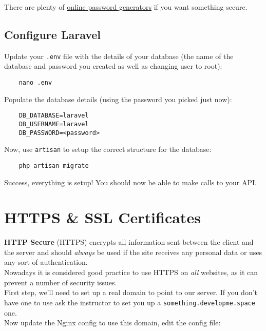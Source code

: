 There are plenty of \href{https://generatepasswords.org}{online password generators} if you want something secure.

\subsection{Configure Laravel}

Update your \texttt{.env} file with the details of your database (the name of the database and password you created as well as changing user to root):

\begin{verbatim}
    nano .env
\end{verbatim}

Populate the database details (using the password you picked just now):

\begin{verbatim}
    DB_DATABASE=laravel
    DB_USERNAME=laravel
    DB_PASSWORD=<password>
\end{verbatim}

Now, use \texttt{artisan} to setup the correct structure for the database:

\begin{verbatim}
    php artisan migrate
\end{verbatim}

Success, everything is setup! You should now be able to make calls to your API.


\section{HTTPS \& SSL Certificates}

\textbf{HTTP Secure} (HTTPS) encrypts all information sent between the client and the server and should \textit{always} be used if the site receives any personal data or uses any sort of authentication.
\\

Nowadays it is considered good practice to use HTTPS on \textit{all} websites, as it can prevent a number of security issues.
\\

First step, we'll need to set up a real domain to point to our server. If you don't have one to use ask the instructor to set you up a \texttt{something.developme.space} one.
\\

Now update the Nginx config to use this domain, edit the config file:

